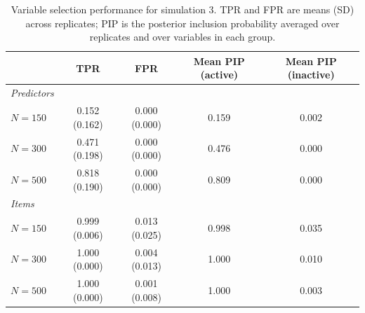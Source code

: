 \begin{table}[H]
\centering
\begin{tabular}{lcccc}
  \toprule
 & TPR & FPR & Mean PIP (active) & Mean PIP (inactive) \\ 
  \midrule
\textit{Predictors} &  &  &  &  \\ 
  $N = 150$ & 0.152 (0.162) & 0.000 (0.000) & 0.159 & 0.002 \\ 
  $N = 300$ & 0.471 (0.198) & 0.000 (0.000) & 0.476 & 0.000 \\ 
  $N = 500$ & 0.818 (0.190) & 0.000 (0.000) & 0.809 & 0.000 \\ 
   \midrule
\textit{Items} &  &  &  &  \\ 
  $N = 150$ & 0.999 (0.006) & 0.013 (0.025) & 0.998 & 0.035 \\ 
  $N = 300$ & 1.000 (0.000) & 0.004 (0.013) & 1.000 & 0.010 \\ 
  $N = 500$ & 1.000 (0.000) & 0.001 (0.008) & 1.000 & 0.003 \\ 
   \bottomrule
\end{tabular}
\caption{Variable selection performance for simulation 3. TPR and FPR are means (SD) across replicates; PIP is the posterior inclusion probability averaged over replicates and over variables in each group.} 
\label{table:sim3_var_sel_summary}
\end{table}
